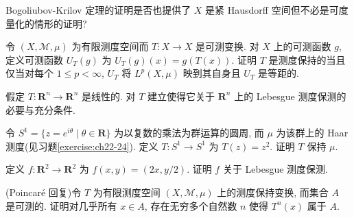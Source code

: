 \documentclass[../../main.tex]{subfiles}
\begin{document}
\begin{exercise}\label{exercise:ch22-26}
Bogoliubov-Krilov 定理的证明是否也提供了 $X$ 是紧 Hausdorff 空间但不必是可度量化的情形的证明?
\end{exercise}

\begin{exercise}\label{exercise:ch22-27}
令 $(X,\mathcal{M},\mu)$ 为有限测度空间而 $T:X\to X$ 是可测变换. 对 $X$ 上的可测函数 $g$, 定义可测函数 $U_{T}(g)$ 为 $U_{T}(g)(x)=g(T(x))$. 证明 $T$ 是测度保持的当且仅当对每个 $1\leqslant p<\infty$, $U_{T}$ 将 $L^{p}(X,\mu)$ 映到其自身且 $U_{T}$ 是等距的.
\end{exercise}

\begin{exercise}\label{exercise:ch22-28}
假定 $T:\mathbf{R}^{n}\to\mathbf{R}^{n}$ 是线性的. 对 $T$ 建立使得它关于 $\mathbf{R}^{n}$ 上的 Lebesgue 测度保测的必要与充分条件.
\end{exercise}

\begin{exercise}\label{exercise:ch22-29}
令 $S^{1}=\{z=e^{i\theta}\mid\theta\in\mathbf{R}\}$ 为以复数的乘法为群运算的圆周, 而 $\mu$ 为该群上的 Haar 测度(见习题\cref{exercise:ch22-24}). 定义 $T:S^{1}\to S^{1}$ 为 $T(z)=z^{2}$. 证明 $T$ 保持 $\mu$.
\end{exercise}

\begin{exercise}\label{exercise:ch22-30}
定义 $f:\mathbf{R}^{2}\to\mathbf{R}^{2}$ 为 $f(x,y)=(2x,y/2)$. 证明 $f$ 关于 Lebesgue 测度保测.
\end{exercise}

\begin{exercise}\label{exercise:ch22-31}
(Poincar\'e 回复)令 $T$ 为有限测度空间 $(X,\mathcal{M},\mu)$ 上的测度保持变换, 而集合 $A$ 是可测的. 证明对几乎所有 $x\in A$, 存在无穷多个自然数 $n$ 使得 $T^{n}(x)$ 属于 $A$.
\end{exercise}
\end{document}

